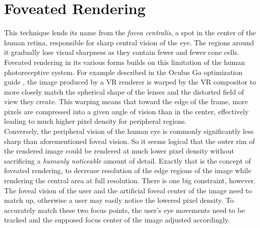 
\section{Foveated Rendering}
This technique lends its name from the \textit{fovea centralis}, a spot in the center of the human retina, responsible for sharp central vision of the eye. The regions around it gradually lose visual sharpness as they contain fewer and fewer cone cells. 
Foveated rendering in its various forms builds on this limitation of the human photoreceptive system. For example described in the Oculus Go optimization guide \cite{Palandri.2018}, the image produced by a VR renderer is warped by the VR compositor to more closely match the spherical shape of the lenses and the distorted field of view they create. This warping means that toward the edge of the frame, more pixels are compressed into a given angle of vision than in the center, effectively leading to much higher pixel density for peripheral regions. \\
Conversely, the peripheral vision of the human eye is commonly significantly less sharp than aforementioned foveal vision. So it seems logical that the outer rim of the rendered image could be rendered at much lower pixel density without sacrificing a \textit{humanly noticeable} amount of detail. 
Exactly that is the concept of foveated rendering, to decrease resolution of the edge regions of the image while rendering the central area at full resolution. 
There is one big constraint, however. The foveal vision of the user and the artificial foveal center of the image need to match up, otherwise a user may easily notice the lowered pixel density. To accurately match these two focus points, the user's eye movements need to be tracked and the supposed focus center of the image adjusted accordingly. 

